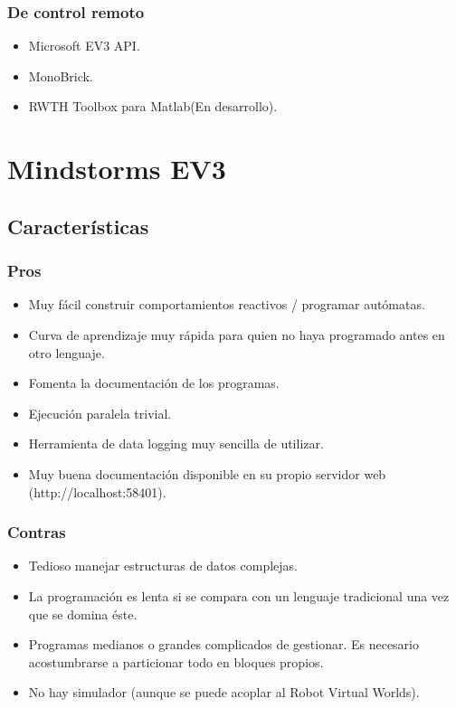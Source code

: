 \documentclass[12pt,a4paper]{article}
\begin{document}
  \subsubsection{De control remoto}
      \begin{itemize}
      \item Microsoft EV3 API.
      \item MonoBrick.
      \item RWTH Toolbox para Matlab(En desarrollo).
      \end{itemize}
\section{Mindstorms EV3}
\subsection{Características}
\subsubsection{Pros}
      \begin{itemize}
      \item Muy fácil construir comportamientos reactivos / programar autómatas.
      \item Curva de aprendizaje muy rápida para quien no haya programado antes en otro lenguaje.
      \item Fomenta la documentación de los programas.
      \item Ejecución paralela trivial.
      \item Herramienta de data logging muy sencilla de utilizar.
      \item Muy buena documentación disponible en su propio servidor web (http://localhost:58401).
      \end{itemize}
\subsubsection{Contras}
      \begin{itemize}
      \item Tedioso manejar estructuras de datos complejas.
      \item La programación es lenta si se compara con un lenguaje tradicional una vez que se domina éste.
      \item Programas medianos o grandes complicados de gestionar. Es necesario acostumbrarse a particionar todo en
      bloques propios.
      \item No hay simulador (aunque se puede acoplar al Robot Virtual Worlds).
      \end{itemize}
\end{document}

